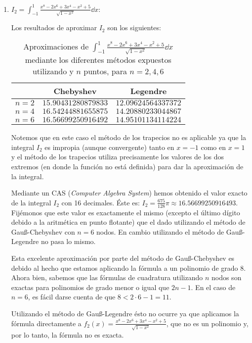 \documentclass[a4paper]{article}
\begin{document}
\begin{enumerate}
    \item $\displaystyle I_2=\int_{-1}^1\frac{x^8-2x^6+3x^4-x^2+5}{\sqrt{1-x^2}}\dd x$:\par
    Los resultados de aproximar $I_2$ son los siguientes:
    \begin{table}[ht]
        \centering
        \captionsetup{width=0.9\textwidth}
        \begin{tabular}{|c|c|c|}
            \cline{2-3}
            \multicolumn{1}{c|}{} & Chebyshev & Legendre \\
            \hline
            $n=2$ & $15.90431280879833$ & $12.09624564337372$ \\
            \hline
            $n=4$ & $16.54244881655875$ & $14.20880233044867$ \\
            \hline
            $n=6$ & $16.56699250916492$ & $14.95101134114224$ \\
            \hline
        \end{tabular}
        \caption{Aproximaciones de $\int_{-1}^1\frac{x^8-2x^6+3x^4-x^2+5}{\sqrt{1-x^2}}\dd x$ mediante los diferentes métodos expuestos utilizando y $n$ puntos, para $n=2,4,6$}
    \end{table}\par
    Notemos que en este caso el método de los trapecios no es aplicable ya que la integral $I_2$ es impropia (aunque convergente) tanto en $x=-1$ como en $x=1$ y el método de los trapecios utiliza precisamente los valores de los dos extremos (en donde la función no está definida) para dar la aproximación de la integral.\par
    Mediante un CAS (\textit{Computer Algebra System}) hemos obtenido el valor exacto de la integral $I_2$ con 16 decimales. Éste es: $I_2=\frac{675}{128}\pi\approx 16.56699250916493$. Fijémonos que este valor es exactamente el mismo (excepto el último dígito debido a la aritmética en punto flotante) que el dado utilizando el método de Gau\ss-Chebyshev con $n=6$ nodos. En cambio utilizando el método de Gau\ss-Legendre no pasa lo mismo.\par
    Esta excelente aproximación por parte del método de Gau\ss-Chebyshev es debido al hecho que estamos aplicando la fórmula a un polinomio de grado 8. Ahora bien, sabemos que las fórmulas de cuadratura utilizando $n$ nodos son exactas para polinomios de grado menor o igual que $2n-1$. En el caso de $n=6$, es fácil darse cuenta de que $8<2\cdot 6-1=11$.\par Utilizando el método de Gau\ss-Legendre ésto no ocurre ya que aplicamos la fórmula directamente a $f_2(x)=\frac{x^8-2x^6+3x^4-x^2+5}{\sqrt{1-x^2}}$, que no es un polinomio y, por lo tanto, la fórmula no es exacta.

\end{enumerate}
\end{document}
